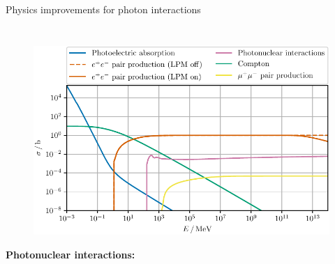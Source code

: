 \documentclass[t]{beamer}
\begin{document}
\begin{columns}[onlytextwidth]
\begin{column}{\textwidth}
\begin{block}{Physics improvements for photon interactions}
\begin{minipage}[t]{0.3\textwidth}
\begin{minipage}[t][10cm]{\textwidth}
\begin{columns}[onlytextwidth]
\begin{column}{0.35\textwidth}
\begin{figure}
\begin{tikzpicture}[>=stealth', pos=.35, photon/.style={decorate,decoration={snake,post length=2mm}}]
                    \end{tikzpicture}
                    \end{figure}
                \end{column}            
            \end{columns}
          \end{minipage}
        \end{minipage}
        \begin{minipage}[t]{0.4\textwidth}
          \begin{figure}
            \vspace{1cm}
            \includegraphics[width=0.9\linewidth, keepaspectratio]{../plots/Photon_Air_dndx_ecut_0.pdf}
          \end{figure}
        \end{minipage}
        \begin{minipage}[t]{0.3\textwidth}
          \begin{minipage}[t][11cm]{\textwidth}
             {\Large\textbf{Photonuclear interactions:}}
            \begin{columns}[onlytextwidth]
                \begin{column}{0.35\textwidth}%
                  \vspace{0.8cm}
                  \begin{figure}
                    \begin{tikzpicture}[>=stealth', pos=.55, photon/.style={decorate,decoration={snake,post length=2mm}}]


\end{tikzpicture}
\end{figure}
\end{column}
\end{columns}
\end{minipage}
\end{minipage}
\end{block}
\end{column}
\end{columns}
\end{document}
